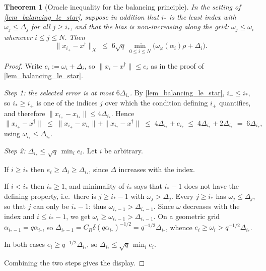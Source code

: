 \documentclass[a4paper]{report}
\theoremstyle{plain}
\newtheorem{theorem}{Theorem}[chapter]
\theoremstyle{definition}
\theoremstyle{remark}
\newcommand{\dg}{^{\dagger}}
\begin{document}
\begin{theorem}[Oracle inequality for the balancing principle]
  \label{thm_balancing_oracle}
  In the setting of \cref{lem_balancing_le_star}, suppose in addition that $i_{*}$ is the
  \emph{least} index with $\omega_j \le \Delta_j$ for all $j \ge i_{*}$, and that the bias
  is non-increasing along the grid: $\omega_j \le \omega_i$ whenever $i \le j \le N$.  Then
  \[
    \|x_{i_{+}} - x\dg\|_X \;\le\; 6\sqrt{q}\ \min_{0 \le i \le N}
      \bigl(\omega_{\varphi}(\alpha_i)\rho + \Delta_i\bigr) .
  \]
\end{theorem}
\begin{proof}
  Write $e_i := \omega_i + \Delta_i$, so $\|x_i-x\dg\| \le e_i$ as in the proof of
  \cref{lem_balancing_le_star}.

  \emph{Step 1: the selected error is at most $6\Delta_{i_{*}}$.}  By
  \cref{lem_balancing_le_star}, $i_{+} \le i_{*}$, so $i_{*} \ge i_{+}$ is one of the
  indices $j$ over which the condition defining $i_{+}$ quantifies, and therefore
  $\|x_{i_{+}}-x_{i_{*}}\| \le 4\Delta_{i_{*}}$.  Hence
  \[
    \|x_{i_{+}}-x\dg\| \;\le\; \|x_{i_{+}}-x_{i_{*}}\| + \|x_{i_{*}}-x\dg\|
      \;\le\; 4\Delta_{i_{*}} + e_{i_{*}}
      \;\le\; 4\Delta_{i_{*}} + 2\Delta_{i_{*}} \;=\; 6\Delta_{i_{*}} ,
  \]
  using $\omega_{i_{*}} \le \Delta_{i_{*}}$.

  \emph{Step 2: $\Delta_{i_{*}} \le \sqrt{q}\,\min_i e_i$.}  Let $i$ be arbitrary.

  If $i \ge i_{*}$ then $e_i \ge \Delta_i \ge \Delta_{i_{*}}$, since $\Delta$ increases
  with the index.

  If $i < i_{*}$ then $i_{*} \ge 1$, and minimality of $i_{*}$ says that $i_{*}-1$ does
  not have the defining property, i.e.\ there is $j \ge i_{*}-1$ with
  $\omega_j > \Delta_j$.  Every $j \ge i_{*}$ has $\omega_j \le \Delta_j$, so that $j$ can
  only be $i_{*}-1$: thus $\omega_{i_{*}-1} > \Delta_{i_{*}-1}$.  Since $\omega$ decreases
  with the index and $i \le i_{*}-1$, we get $\omega_i \ge \omega_{i_{*}-1}
  > \Delta_{i_{*}-1}$.  On a geometric grid $\alpha_{i_{*}-1} = q\alpha_{i_{*}}$, so
  $\Delta_{i_{*}-1} = C_R\delta(q\alpha_{i_{*}})^{-1/2} = q^{-1/2}\Delta_{i_{*}}$, whence
  $e_i \ge \omega_i > q^{-1/2}\Delta_{i_{*}}$.

  In both cases $e_i \ge q^{-1/2}\Delta_{i_{*}}$, so
  $\Delta_{i_{*}} \le \sqrt{q}\,\min_i e_i$.

  Combining the two steps gives the display.
\end{proof}
\end{document}
